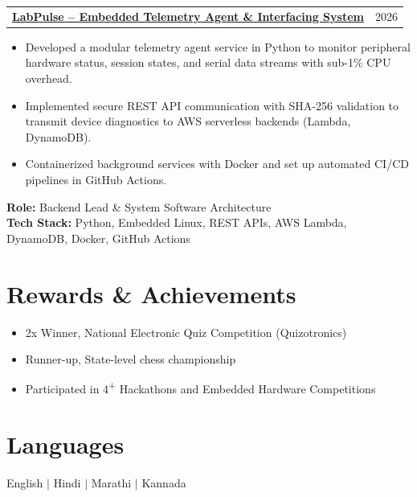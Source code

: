 \documentclass[letterpaper,10pt]{article}
\makeatletter
\newcommand{\resumeItemListStart}{\begin{itemize}[leftmargin=0.18in, topsep=1.5pt, parsep=0pt, itemsep=1pt]}
\newcommand{\resumeItemListEnd}{\end{itemize}\vspace{-4pt}}
\newcommand{\resumeItem}[1]{\item\small{#1}}
\newcommand{\resumeProjectHeading}[2]{
  \vspace{-1pt}
  \begin{tabular*}{\textwidth}[t]{l@{\extracolsep{\fill}}r}
    \textbf{#1} & #2 \\
  \end{tabular*}\vspace{-4pt}
}
\makeatother
\begin{document}
\vspace{3pt}

\resumeProjectHeading
  {\href{https://github.com/AdityaMittha/LabPulse}{\textbf{LabPulse -- Embedded Telemetry Agent \& Interfacing System}}}{2026}
\resumeItemListStart
  \resumeItem{Developed a modular telemetry agent service in Python to monitor peripheral hardware status, session states, and serial data streams with sub-1\% CPU overhead.}
  \resumeItem{Implemented secure REST API communication with SHA-256 validation to transmit device diagnostics to AWS serverless backends (Lambda, DynamoDB).}
  \resumeItem{Containerized background services with Docker and set up automated CI/CD pipelines in GitHub Actions.}
\resumeItemListEnd
\small{\textbf{Role:} Backend Lead \& System Software Architecture} \\
\small{\textbf{Tech Stack:} Python, Embedded Linux, REST APIs, AWS Lambda, DynamoDB, Docker, GitHub Actions}

\vspace{-2pt}

\section{Rewards \& Achievements}
\resumeItemListStart
  \resumeItem{2x Winner, National Electronic Quiz Competition (Quizotronics)}
  \resumeItem{Runner-up, State-level chess championship}
  \resumeItem{Participated in 4\textsuperscript{+} Hackathons and Embedded Hardware Competitions}
\resumeItemListEnd

\vspace{-4pt}

\section{Languages}
\small
English \enspace $|$ \enspace Hindi \enspace $|$ \enspace Marathi \enspace $|$ \enspace Kannada
\end{document}
